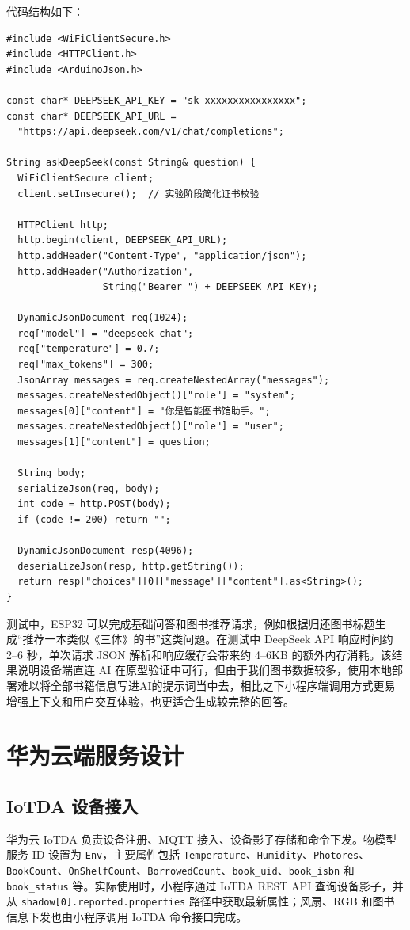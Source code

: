 \documentclass[12pt,hyperref,a4paper,UTF8]{ctexart}
\begin{document}
代码结构如下：

\begin{lstlisting}
#include <WiFiClientSecure.h>
#include <HTTPClient.h>
#include <ArduinoJson.h>

const char* DEEPSEEK_API_KEY = "sk-xxxxxxxxxxxxxxxx";
const char* DEEPSEEK_API_URL =
  "https://api.deepseek.com/v1/chat/completions";

String askDeepSeek(const String& question) {
  WiFiClientSecure client;
  client.setInsecure();  // 实验阶段简化证书校验

  HTTPClient http;
  http.begin(client, DEEPSEEK_API_URL);
  http.addHeader("Content-Type", "application/json");
  http.addHeader("Authorization",
                 String("Bearer ") + DEEPSEEK_API_KEY);

  DynamicJsonDocument req(1024);
  req["model"] = "deepseek-chat";
  req["temperature"] = 0.7;
  req["max_tokens"] = 300;
  JsonArray messages = req.createNestedArray("messages");
  messages.createNestedObject()["role"] = "system";
  messages[0]["content"] = "你是智能图书馆助手。";
  messages.createNestedObject()["role"] = "user";
  messages[1]["content"] = question;

  String body;
  serializeJson(req, body);
  int code = http.POST(body);
  if (code != 200) return "";

  DynamicJsonDocument resp(4096);
  deserializeJson(resp, http.getString());
  return resp["choices"][0]["message"]["content"].as<String>();
}
\end{lstlisting}

测试中，ESP32 可以完成基础问答和图书推荐请求，例如根据归还图书标题生成“推荐一本类似《三体》的书”这类问题。在测试中 DeepSeek API 响应时间约 2--6 秒，单次请求 JSON 解析和响应缓存会带来约 4--6KB 的额外内存消耗。该结果说明设备端直连 AI 在原型验证中可行，但由于我们图书数据较多，使用本地部署难以将全部书籍信息写进AI的提示词当中去，相比之下小程序端调用方式更易增强上下文和用户交互体验，也更适合生成较完整的回答。

\section{华为云端服务设计}

\subsection{IoTDA 设备接入}

华为云 IoTDA 负责设备注册、MQTT 接入、设备影子存储和命令下发。物模型服务 ID 设置为 \texttt{Env}，主要属性包括 \texttt{Temperature}、\texttt{Humidity}、\texttt{Photores}、\texttt{BookCount}、\texttt{OnShelfCount}、\texttt{BorrowedCount}、\texttt{book\_uid}、\texttt{book\_isbn} 和 \texttt{book\_status} 等。实际使用时，小程序通过 IoTDA REST API 查询设备影子，并从 \texttt{shadow[0].reported.properties} 路径中获取最新属性；风扇、RGB 和图书信息下发也由小程序调用 IoTDA 命令接口完成。
\end{document}
